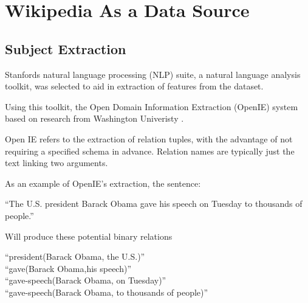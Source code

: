 \documentclass[12pt]{report}
\begin{document}


\chapter{Wikipedia As a Data Source}

        \section{Subject Extraction}
        Stanfords natural language processing (NLP) suite,
        a natural language analysis toolkit,
        was selected to aid in extraction of features from the dataset.

        Using this toolkit, the Open Domain Information Extraction (OpenIE) system
        based on research from Washington Univeristy \cite{angeli2015leveraging}.

        Open IE refers to the extraction of relation tuples, with the advantage of not requiring a
        specified schema in advance. Relation names are typically just the text linking two arguments.

        As an example of OpenIE's extraction, the sentence:\\
        \begin{center}
        ``The U.S. president Barack Obama gave his speech on Tuesday to thousands of people.''\\
        \end{center}
        Will produce these potential binary relations\\
        \begin{center}
        ``president(Barack Obama, the U.S.)''\\
        ``gave(Barack Obama,his speech)''\\
        ``gave-speech(Barack Obama, on Tuesday)''\\
        ``gave-speech(Barack Obama, to thousands of people)''\\
        \end{center}
\end{document}
